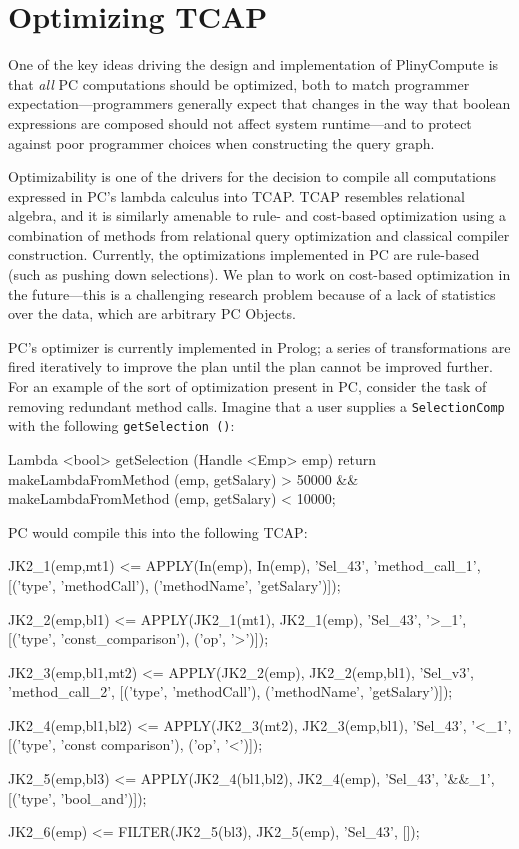 
\section{Optimizing TCAP}
\label{sec:optimizer}

One of the key ideas driving the design and implementation of PlinyCompute is that \emph{all} PC computations should be optimized, both to
match programmer expectation---programmers generally expect
that changes in the way that boolean expressions are composed should not affect system runtime---and 
to protect against poor programmer choices when constructing the query graph.

Optimizability is one of the drivers for
the decision to compile all computations expressed in PC's lambda calculus into TCAP.  
TCAP resembles relational algebra, and it is similarly amenable to rule- and cost-based optimization
using a combination of methods from relational query optimization and classical compiler construction.
Currently, the optimizations implemented in PC are rule-based (such as pushing down selections).  We plan to work on cost-based optimization
in the future---this is a challenging research problem because of a lack of statistics over the data, which are arbitrary PC Objects.

PC's optimizer is currently implemented
in Prolog; a series of transformations are fired iteratively to improve the plan until the plan cannot be improved further.
For an example of the sort of optimization present in PC, consider the task of removing redundant method calls.  Imagine that a user
supplies a \texttt{SelectionComp} with the following \texttt{getSelection ()}:

\begin{codesmall} 
Lambda <bool> getSelection (Handle <Emp> emp) {
        return makeLambdaFromMethod (emp, getSalary) > 50000 &&
		makeLambdaFromMethod (emp, getSalary) < 10000;
}	
\end{codesmall}

\noindent PC would compile this into the following TCAP:

\begin{codesmall}
JK2_1(emp,mt1) <= APPLY(In(emp), In(emp), 'Sel_43', 'method_call_1',
  [('type', 'methodCall'), ('methodName', 'getSalary')]);

JK2_2(emp,bl1) <= APPLY(JK2_1(mt1), JK2_1(emp), 'Sel_43', '>_1', 
  [('type', 'const_comparison'), ('op', '>')]);

JK2_3(emp,bl1,mt2) <= APPLY(JK2_2(emp), JK2_2(emp,bl1), 'Sel_v3', 'method_call_2',
  [('type', 'methodCall'), ('methodName', 'getSalary')]);

JK2_4(emp,bl1,bl2) <= APPLY(JK2_3(mt2), JK2_3(emp,bl1), 'Sel_43', '<_1',
  [('type', 'const comparison'), ('op', '<')]);

JK2_5(emp,bl3) <= APPLY(JK2_4(bl1,bl2), JK2_4(emp), 'Sel_43', '&&_1', 
  [('type', 'bool_and')]);

JK2_6(emp) <= FILTER(JK2_5(bl3), JK2_5(emp), 'Sel_43', []);
\end{codesmall}

